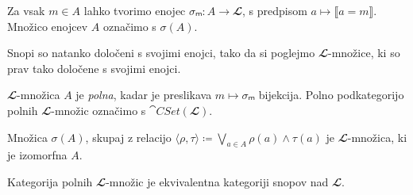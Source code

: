 \begin{lema}
  Za vsak \(m ∈ A\) lahko tvorimo enojec \(σₘ : A → 𝓛\), s predpisom
  \(a ↦ ⟦a = m⟧\). Množico enojcev \(A\) označimo s \(σ(A)\).
\end{lema}

Snopi so natanko določeni s svojimi enojci, tako da si poglejmo \(𝓛\)-množice,
ki so prav tako določene s svojimi enojci.

\begin{definicija}
  \(𝓛\)-množica \(A\) je \emph{polna}, kadar je preslikava \(m ↦ σₘ\) bijekcija.
  Polno podkategorijo polnih \(𝓛\)-množic označimo s \(\cat{CSet}(𝓛)\).
\end{definicija}

\begin{izrek}
  Množica \(σ(A)\), skupaj z relacijo \(⟨ρ, τ⟩ ≔ ⋁_{a ∈ A} ρ(a)∧τ(a)\)
  je \(𝓛\)-množica, ki je izomorfna \(A\).
\end{izrek}
\begin{dokaz}
\end{dokaz}

\begin{trditev}
\end{trditev}

\begin{izrek}
  Kategorija polnih \(𝓛\)-množic je ekvivalentna kategoriji snopov nad \(𝓛\).
\end{izrek}



